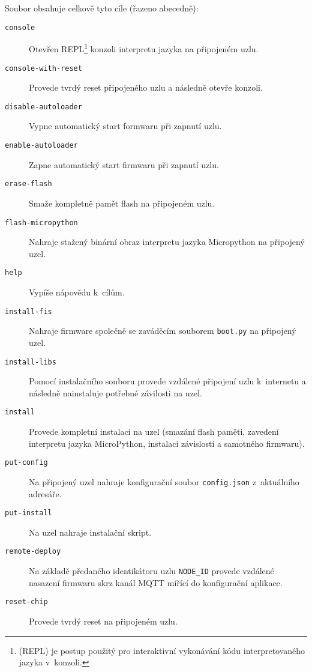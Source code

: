 Soubor  obsahuje celkově tyto cíle (řazeno abecedně):
\begin{description}
    \item[\texttt{console}] Otevřen REPL\footnote{ (REPL) je postup použitý pro
    interaktivní vykonávání kódu interpretovaného jazyka v~konzoli.} konzoli interpretu jazyka na připojeném uzlu.
    \item[\texttt{console-with-reset}] Provede tvrdý reset připojeného uzlu a následně otevře konzoli.
    \item[\texttt{disable-autoloader}] Vypne automatický start formwaru při zapnutí uzlu.
    \item[\texttt{enable-autoloader}] Zapne automatický start firmwaru při zapnutí uzlu.
    \item[\texttt{erase-flash}] Smaže kompletně pamět flash na připojeném uzlu.
    \item[\texttt{flash-micropython}] Nahraje stažený binární obraz interpretu jazyka Micropython na připojený uzel.
    \item[\texttt{help}] Vypíše nápovědu k~cílům.
    \item[\texttt{install-fis}] Nahraje firmware společně se zaváděcím souborem \texttt{boot.py} na připojený uzel.
    \item[\texttt{install-libs}] Pomocí instalačního souboru provede vzdálené připojení uzlu k~internetu a následně
    nainstaluje potřebné závilosti na uzel.
    \item[\texttt{install}] Provede kompletní instalaci na uzel (smazání flash paměti, zavedení interpretu jazyka
    MicroPython, instalaci závislostí a samotného firmwaru).
    \item[\texttt{put-config}] Na připojený uzel nahraje konfigurační soubor \texttt{config.json} z~aktuálního adresáře.
    \item[\texttt{put-install}] Na uzel nahraje instalační skript.
    \item[\texttt{remote-deploy}] Na základě předaného identikátoru uzlu \texttt{NODE\_ID} provede vzdálené nasazení
    firmwaru skrz kanál MQTT mířící do konfigurační aplikace.
    \item[\texttt{reset-chip}] Provede tvrdý reset na připojeném uzlu.
\end{description}
